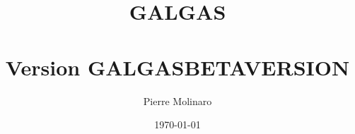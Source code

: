 \documentclass[a4paper, 10pt, obeyspaces, openany]{book}
\begin{document}
 


\title{\Huge{\textbf{GALGAS}}\\~\\ \normalsize{Version GALGASBETAVERSION}}
\author{Pierre Molinaro}
\date \today 

\maketitle


\tableofcontents
\etocsettocstyle{}{}


\newpage
\listoftables
{}
\end{document}
